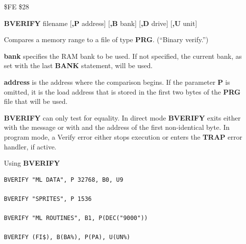 \begin{description}[leftmargin=2cm,style=nextline]
\item [Token:]    \$FE \$28

\item [Format:]   {\bf BVERIFY} filename [{\bf,P} address] [{\bf,B} bank] [{\bf,D} drive] [{\bf,U} unit]

\item [Usage:]    Compares a memory range to a file of type {\bf PRG}. (``Binary verify.'')

                  \filenamedefinition

                  {\bf bank} specifies the RAM bank to be used. If not specified, the current bank, as set with the last {\bf BANK} statement, will be used.

                  {\bf address} is the address where the comparison begins. If the parameter {\bf P} is omitted, it is the load address that is stored in the first two bytes of the {\bf PRG} file that will be used.

                  \drivedefinition

                  \unitdefinition

\item [Remarks:]  {\bf BVERIFY} can only test for equality. In direct mode {\bf BVERIFY} exits either with the message  or with  and the address of the first non-identical byte. In program mode, a Verify error either stops execution or enters the {\bf TRAP} error handler, if active.

\item [Examples:] Using {\bf BVERIFY}

\begin{tcolorbox}[colback=black,coltext=white]
\verbatimfont{\codefont}
\begin{verbatim}
BVERIFY "ML DATA", P 32768, B0, U9

BVERIFY "SPRITES", P 1536

BVERIFY "ML ROUTINES", B1, P(DEC("9000"))

BVERIFY (FI$), B(BA%), P(PA), U(UN%)
\end{verbatim}
\end{tcolorbox}
\end{description}


\newpage
